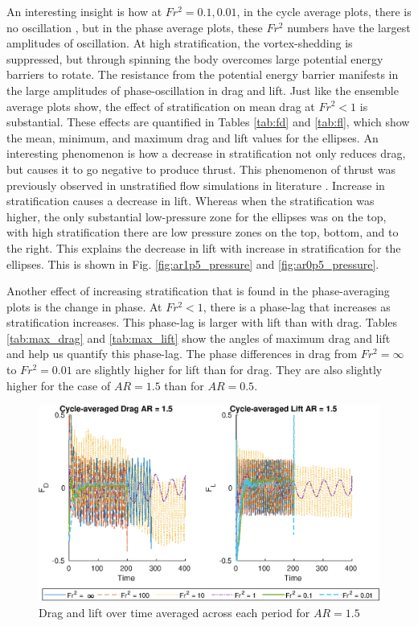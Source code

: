 An interesting insight is how at $Fr^2 = 0.1, 0.01$, in the cycle average plots, there is no oscillation , but in the phase average plots, these $Fr^2$ numbers have the largest amplitudes of oscillation. At high stratification, the vortex-shedding is suppressed, but through spinning the body overcomes large potential energy barriers to rotate. The resistance from the potential energy barrier manifests in the large amplitudes of phase-oscillation in drag and lift. Just like the ensemble average plots show, the effect of stratification on mean drag at $Fr^2 < 1$ is substantial. These effects are quantified in Tables \ref{tab:fd} and \ref{tab:fl}, which show the mean, minimum, and maximum drag and lift values for the ellipses. An interesting phenomenon is how a decrease in stratification not only reduces drag, but causes it to go negative to produce thrust.  This phenomenon of thrust was previously observed in unstratified flow simulations in literature \cite{lua_rotating_2018}. Increase in stratification causes a decrease in lift. Whereas when the stratification was higher, the only substantial low-pressure zone for the ellipses was on the top, with high stratification there are low pressure zones on the top, bottom, and to the right. This explains the decrease in lift with increase in stratification for the ellipses. This is shown in Fig. \ref{fig:ar1p5_pressure} and \ref{fig:ar0p5_pressure}.

Another effect of increasing stratification that is found in the phase-averaging plots is the change in phase. At $Fr^2 < 1$, there is a phase-lag that increases as stratification increases. This phase-lag is larger with lift than with drag. Tables \ref{tab:max_drag} and \ref{tab:max_lift} show the angles of maximum drag and lift and help us quantify this phase-lag. The phase differences in drag from $Fr^2 = \infty$ to $Fr^2 = 0.01$ are slightly higher for lift than for drag. They are also slightly higher for the case of $AR = 1.5$ than for $AR = 0.5$. 
 
\begin{figure}
    \centerline{\includegraphics[width=\textwidth]{images/spinning_ellipse/mvmean1p5.eps}}
    \caption{Drag and lift over time averaged across each period for $AR = 1.5$}
    \label{fig:mvmean1p5}
\end{figure}

